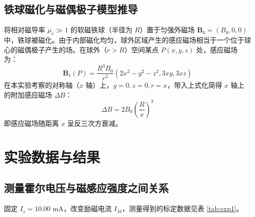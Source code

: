 \documentclass[a4paper, 10pt]{ctexart}
\begin{document}
	\subsection{铁球磁化与磁偶极子模型推导}
	将相对磁导率 $\mu_r \gg 1$ 的软磁铁球（半径为 $R$）置于匀强外磁场 $\mathbf{B}_0 = (B_0, 0, 0)$ 中，铁球被磁化。由于内部磁化均匀，球外区域产生的感应磁场相当于一个位于球心的磁偶极子产生的场。在球外（$r > R$）空间某点 $P(x,y,z)$ 处，感应磁场为：
	\begin{equation}
		\mathbf{B}_1(P) = \frac{R^3 B_0}{r^5} (2x^2 - y^2 - z^2, 3xy, 3xz)
	\end{equation}
	在本实验考察的对称轴（$x$ 轴）上，$y=0, z=0, r=x$，带入上式化简得 $x$ 轴上的附加感应磁场 $\Delta B$：
	\begin{equation}
		\Delta B = 2B_0 \left( \frac{R}{x} \right)^3
	\end{equation}
	即感应磁场随距离 $x$ 呈反三次方衰减。
	
	\section{实验数据与结果}
	
	\subsection{测量霍尔电压与磁感应强度之间关系}
	固定 $I_s = 10.00\text{ mA}$，改变励磁电流 $I_M$，测量得到的标定数据见表 \ref{tab:exp1}。
	
	\begin{table}[H]
		\centering
		\caption{霍尔电压与磁感应强度的标定数据}
		\label{tab:exp1}

	\end{table}
	
\end{document}
